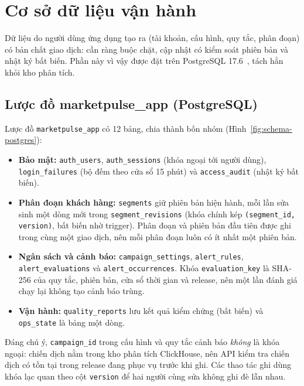 \section{Cơ sở dữ liệu vận hành}
\label{sec:c4-csdl-van-hanh}

Dữ liệu do người dùng ứng dụng tạo ra (tài khoản, cấu hình, quy tắc, phân đoạn) có bản chất giao dịch: cần ràng buộc chặt, cập nhật có kiểm soát phiên bản và nhật ký bất biến. Phần này vì vậy được đặt trên PostgreSQL 17.6~\cite{postgresdocs}, tách hẳn khỏi kho phân tích.

\subsection{Lược đồ marketpulse\_app (PostgreSQL)}
\label{sec:c4-pg-app}
Lược đồ \texttt{marketpulse\_app} có 12 bảng, chia thành bốn nhóm (Hình~\ref{fig:schema-postgres}):

\begin{itemize}
    \item \textbf{Bảo mật:} \texttt{auth\_users}, \texttt{auth\_sessions} (khóa ngoại tới người dùng), \texttt{login\_failures} (bộ đếm theo cửa sổ 15 phút) và \texttt{access\_audit} (nhật ký bất biến).
    \item \textbf{Phân đoạn khách hàng:} \texttt{segments} giữ phiên bản hiện hành, mỗi lần sửa sinh một dòng mới trong \texttt{segment\_revisions} (khóa chính kép \texttt{(segment\_id, version)}, bất biến nhờ trigger). Phân đoạn và phiên bản đầu tiên được ghi trong cùng một giao dịch, nên mỗi phân đoạn luôn có ít nhất một phiên bản.
    \item \textbf{Ngân sách và cảnh báo:} \texttt{campaign\_settings}, \texttt{alert\_rules}, \texttt{alert\_evaluations} và \texttt{alert\_occurrences}. Khóa \texttt{evaluation\_key} là SHA-256 của quy tắc, phiên bản, cửa sổ thời gian và release, nên một lần đánh giá chạy lại không tạo cảnh báo trùng.
    \item \textbf{Vận hành:} \texttt{quality\_reports} lưu kết quả kiểm chứng (bất biến) và \texttt{ops\_state} là bảng một dòng.
\end{itemize}

Đáng chú ý, \texttt{campaign\_id} trong cấu hình và quy tắc cảnh báo \emph{không} là khóa ngoại: chiến dịch nằm trong kho phân tích ClickHouse, nên API kiểm tra chiến dịch có tồn tại trong release đang phục vụ trước khi ghi. Các thao tác ghi dùng khóa lạc quan theo cột \texttt{version} để hai người cùng sửa không ghi đè lẫn nhau.

